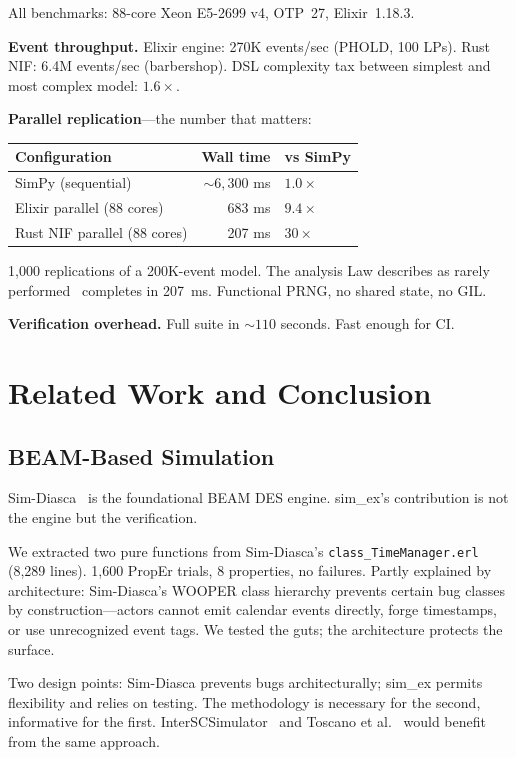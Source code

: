 \documentclass[sigplan,review,anonymous=false]{acmart}
\begin{document}
All benchmarks: 88-core Xeon E5-2699 v4, OTP~27, Elixir~1.18.3.

\textbf{Event throughput.} Elixir engine: 270K events/sec (PHOLD, 100
LPs). Rust NIF: 6.4M events/sec (barbershop). DSL complexity tax
between simplest and most complex model: $1.6\times$.

\textbf{Parallel replication}---the number that matters:

\begin{table}[h]
\small
\begin{tabular}{lrl}
\toprule
Configuration & Wall time & vs SimPy \\
\midrule
SimPy (sequential) & ${\sim}6{,}300$ ms & $1.0\times$ \\
Elixir parallel (88 cores) & 683 ms & $9.4\times$ \\
Rust NIF parallel (88 cores) & 207 ms & $30\times$ \\
\bottomrule
\end{tabular}
\end{table}

1,000 replications of a 200K-event model. The analysis Law describes as
rarely performed~\cite{law2014} completes in 207~ms. Functional PRNG,
no shared state, no GIL.

\textbf{Verification overhead.} Full suite in ${\sim}110$ seconds. Fast
enough for CI.


\section{Related Work and Conclusion}

\subsection{BEAM-Based Simulation}

Sim-Diasca~\cite{boudeville2010} is the foundational BEAM DES engine.
sim\_ex's contribution is not the engine but the verification.

We extracted two pure functions from Sim-Diasca's
\texttt{class\_TimeManager.erl} (8,289 lines). 1,600 PropEr trials, 8
properties, no failures. Partly explained by architecture: Sim-Diasca's
WOOPER class hierarchy prevents certain bug classes by
construction---actors cannot emit calendar events directly, forge
timestamps, or use unrecognized event tags. We tested the guts; the
architecture protects the surface.

Two design points: Sim-Diasca prevents bugs architecturally; sim\_ex
permits flexibility and relies on testing. The methodology is necessary
for the second, informative for the first.
InterSCSimulator~\cite{santana2017} and Toscano et al.~\cite{toscano2012}
would benefit from the same approach.
\end{document}
